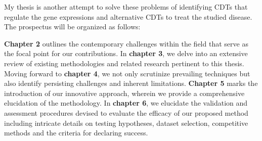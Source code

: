 %
%

My thesis is another attempt to solve these problems of identifying CDTs that regulate the gene expressions and alternative CDTs to treat the studied disease. The prospectus will be organized as follows:

\textbf{Chapter 2}  outlines the contemporary challenges within the field that serve as the focal point for our contributions. 
In \textbf{chapter 3}, we delve into an extensive review of existing methodologies and related research pertinent to this thesis.
Moving forward to \textbf{chapter 4},  we not only scrutinize prevailing techniques but also identify persisting challenges and inherent limitations. \textbf{Chapter 5} marks the introduction of our innovative approach, wherein we provide a comprehensive elucidation of the methodology. In \textbf{chapter 6}, we elucidate the validation and assessment procedures devised to evaluate the efficacy of our proposed method including intricate details on testing hypotheses, dataset selection, competitive methods and the criteria for declaring success.

